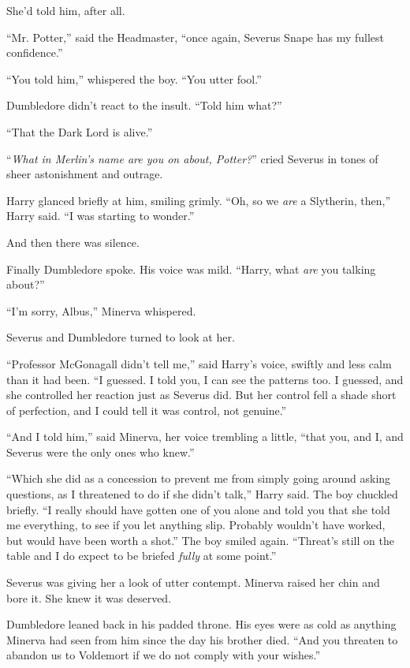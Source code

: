 She'd told him, after all.

``Mr. Potter,'' said the Headmaster, ``once again, Severus Snape has my fullest confidence.''

``You told him,'' whispered the boy. ``You utter fool.''

Dumbledore didn't react to the insult. ``Told him what?''

``That the Dark Lord is alive.''

``\emph{What in Merlin's name are you on about, Potter?}'' cried Severus in tones of sheer astonishment and outrage.

Harry glanced briefly at him, smiling grimly. ``Oh, so we \emph{are} a Slytherin, then,'' Harry said. ``I was starting to wonder.''

And then there was silence.

Finally Dumbledore spoke. His voice was mild. ``Harry, what \emph{are} you talking about?''

``I'm sorry, Albus,'' Minerva whispered.

Severus and Dumbledore turned to look at her.

``Professor McGonagall didn't tell me,'' said Harry's voice, swiftly and less calm than it had been. ``I guessed. I told you, I can see the patterns too. I guessed, and she controlled her reaction just as Severus did. But her control fell a shade short of perfection, and I could tell it was control, not genuine.''

``And I told him,'' said Minerva, her voice trembling a little, ``that you, and I, and Severus were the only ones who knew.''

``Which she did as a concession to prevent me from simply going around asking questions, as I threatened to do if she didn't talk,'' Harry said. The boy chuckled briefly. ``I really should have gotten one of you alone and told you that she told me everything, to see if you let anything slip. Probably wouldn't have worked, but would have been worth a shot.'' The boy smiled again. ``Threat's still on the table and I do expect to be briefed \emph{fully} at some point.''

Severus was giving her a look of utter contempt. Minerva raised her chin and bore it. She knew it was deserved.

Dumbledore leaned back in his padded throne. His eyes were as cold as anything Minerva had seen from him since the day his brother died. ``And you threaten to abandon us to Voldemort if we do not comply with your wishes.''

